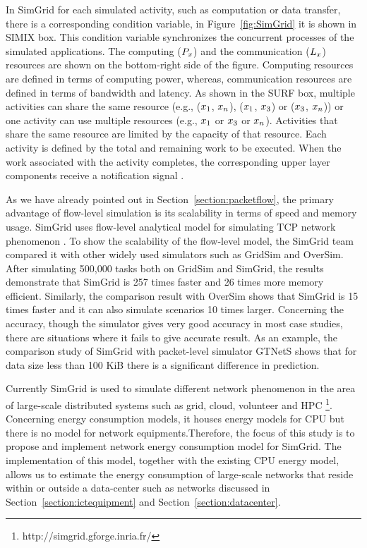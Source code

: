 In SimGrid for each simulated activity, such as computation or data transfer, there is a corresponding condition variable, in Figure~\ref{fig:SimGrid} it is shown in SIMIX box. This condition variable synchronizes the concurrent processes of the simulated applications. The computing (\($$P_{x}$$\)) and the communication (\($$L_{x}$$\)) resources are shown on the bottom-right side of the figure. Computing resources are defined in terms of computing power, whereas, communication resources are defined in terms of bandwidth and latency. As shown in the SURF box, multiple activities can share the same resource (e.g., (\($$x_{1}$$\), \($$x_{n}$$\)), (\($$x_{1}$$\), \($$x_{3}$$\)) or (\($$x_{3}$$\), \($$x_{n}$$\))) or one activity can use multiple resources (e.g., \($$x_{1}$$\) or \($$x_{3}$$\) or  \($$x_{n}$$\)). Activities that share the same resource are limited by the capacity of that resource. Each activity is defined by the total and remaining work to be executed. When the work associated with the activity completes, the corresponding upper layer components receive a notification signal \cite{DBLP:journals/jpdc/CasanovaGLQS14}.

As we have already pointed out in Section~\ref{section:packetflow}, the primary advantage of flow-level simulation is its scalability in terms of speed and memory usage. SimGrid uses flow-level analytical model for simulating TCP network phenomenon \cite{DBLP:journals/jpdc/CasanovaGLQS14}. To show the scalability of the flow-level model, the SimGrid team compared it with other widely used simulators such as GridSim and OverSim. After simulating 500,000 tasks both on GridSim and SimGrid, the results demonstrate that SimGrid is 257 times faster and 26 times more memory efficient. Similarly, the comparison result with OverSim shows that SimGrid is 15 times faster and it can also simulate scenarios 10 times larger. Concerning the accuracy, though the simulator gives very good accuracy in most case studies, there are situations where it fails to give accurate result. As an example, the comparison study of SimGrid with packet-level simulator GTNetS shows that for data size less than 100 KiB there is a significant difference in prediction. 

Currently SimGrid is used to simulate different network phenomenon in the area of large-scale distributed systems such as grid, cloud, volunteer and HPC \footnote{http://simgrid.gforge.inria.fr/}. Concerning energy consumption models, it houses energy models for CPU but there is no model for network equipments.Therefore, the focus of this study is to propose and implement network energy consumption model for SimGrid. The implementation of this model, together with the existing CPU energy model, allows us to estimate the energy consumption of large-scale networks that reside within or outside a data-center such as networks discussed in Section~\ref{section:ictequipment} and Section~\ref{section:datacenter}.

